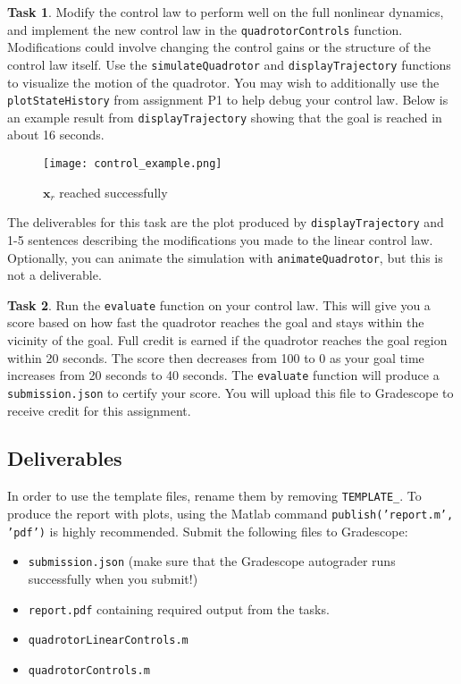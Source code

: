 \documentclass{article}
\theoremstyle{definition}
\newtheorem{task}{Task}
\begin{document}
\begin{task}
    Modify the control law to perform well on the full nonlinear dynamics, and implement the new control law in the \texttt{quadrotorControls} function.
Modifications could involve changing the control gains or the structure of the control law itself.
Use the \texttt{simulateQuadrotor} and \texttt{displayTrajectory} functions to visualize the motion of the quadrotor. 
You may wish to additionally use the \texttt{plotStateHistory} from assignment P1 to help debug your control law.
Below is an example result from \texttt{displayTrajectory} showing that the goal is reached in about 16 seconds.
    \begin{figure}[h]
    \centering
    \begin{minipage}{0.6\textwidth}
            \centering
            \texttt{[image: control\_example.png]}
            \caption{$\mathbf{x}_r$ reached successfully}
    \end{minipage}
    \end{figure}

The deliverables for this task are the plot produced by \texttt{displayTrajectory} and 1-5 sentences describing the modifications you made to the linear control law.
Optionally, you can animate the simulation with \texttt{animateQuadrotor}, but this is not a deliverable.
\end{task}

\begin{task}
    Run the \texttt{evaluate} function on your control law. This will give you a score based on how fast the quadrotor reaches the goal and stays within the vicinity of the goal. Full credit is earned if the quadrotor reaches the goal region within 20 seconds. The score then decreases from 100 to 0 as your goal time increases from 20 seconds to 40 seconds. The \texttt{evaluate} function will produce a \texttt{submission.json} to certify your score. You will upload this file to Gradescope to receive credit for this assignment.
\end{task}


\subsection*{Deliverables}
In order to use the template files, rename them by removing \texttt{TEMPLATE\_}. To produce the report with plots, using the Matlab command \texttt{publish('report.m', 'pdf')} is highly recommended. Submit the following files to Gradescope:
\begin{itemize}[noitemsep]
    \item \texttt{submission.json} (make sure that the Gradescope autograder runs successfully when you submit!)
    \item \texttt{report.pdf} containing required output from the tasks.
    \item \texttt{quadrotorLinearControls.m}
    \item \texttt{quadrotorControls.m}
\end{itemize}
\end{document}
